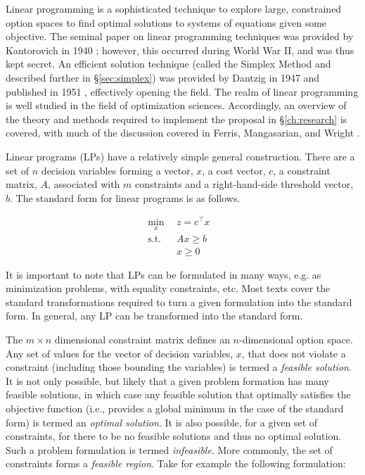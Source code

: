 Linear programming is a sophisticated technique to explore large, constrained
option spaces to find optimal solutions to systems of equations given some
objective. The seminal paper on linear programming techniques was provided by
Kantorovich in 1940 \cite{kantorovich_new_1940}; however, this occurred during
World War II, and was thus kept secret. An efficient solution technique (called
the Simplex Method and described further in \S\ref{sec:simplex}) was provided by
Dantzig in 1947 and published in 1951 \cite{dantzig_maximization_1951},
effectively opening the field. The realm of linear programming is well studied
in the field of optimization sciences. Accordingly, an overview of the theory
and methods required to implement the proposal in \S \ref{ch:research} is
covered, with much of the discussion covered in Ferris, Mangasarian, and
Wright \cite{ferris_linear_2008}.

Linear programs (LPs) have a relatively simple general construction. There are a
set of $n$ decision variables forming a vector, $x$, a cost vector, $c$, a
constraint matrix, $A$, associated with $m$ constraints and a right-hand-side
threshold vector, $b$. The standard form for linear programs is as follows.

\begin{subequations}\label{eqs:std-form}
  \begin{align}
    \min_{x} \:\: & 
    z = c^{\top} x
    & \label{eqs:std-form_obj} \\
    \text{s.t.} \:\: &
    A x \geq b 
    & \label{eqs:std-form_sup} \\
    &
    x \geq 0
    &\label{eqs:std-form_x}
  \end{align}
\end{subequations}

It is important to note that LPs can be formulated in many ways, e.g. as
minimization problems, with equality constraints, etc. Most texts cover the
standard transformations required to turn a given formulation into the standard
form. In general, any LP can be transformed into the standard form.

The $m \times n$ dimensional constraint matrix defines an $n$-dimensional option
space. Any set of values for the vector of decision variables, $x$, that does
not violate a constraint (including those bounding the variables) is termed
a \textit{feasible solution}. It is not only possible, but likely that a given
problem formation has many feasible solutions, in which case any feasible
solution that optimally satisfies the objective function (i.e., provides a
global minimum in the case of the standard form) is termed an \textit{optimal
solution}. It is also possible, for a given set of constraints, for there to be
no feasible solutions and thus no optimal solution. Such a problem formulation
is termed \textit{infeasible}. More commonly, the set of constraints forms
a \textit{feasible region}. Take for example the following formulation:

